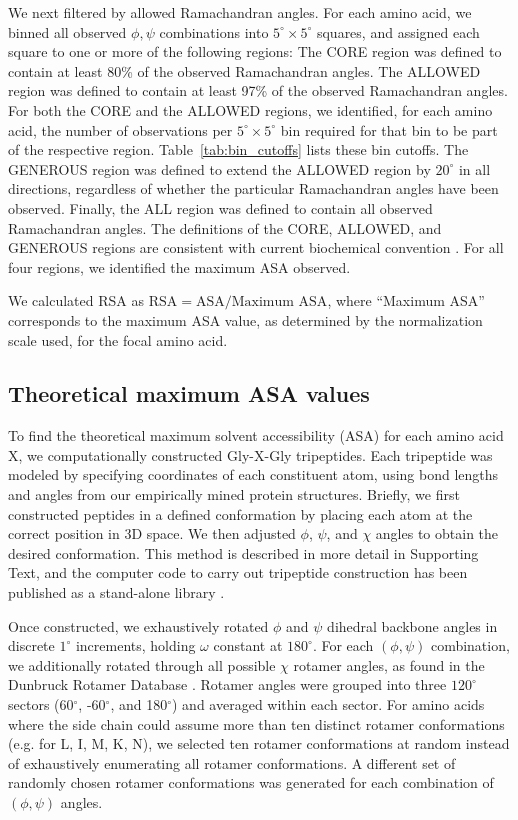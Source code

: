 \documentclass[11pt]{article}
\begin{document}
We next filtered by allowed Ramachandran angles. For each amino acid, we binned all observed $\phi, \psi$ combinations into $5^\circ\times5^\circ$ squares, and assigned each square to one or more of the following regions: The CORE region was defined to contain at least 80\% of the observed Ramachandran angles. The ALLOWED region was defined to contain at least 97\% of the observed Ramachandran angles. For both the CORE and the ALLOWED regions, we identified, for each amino acid, the number of observations per $5^\circ\times5^\circ$ bin required for that bin to be part of the respective region. Table~\ref{tab:bin_cutoffs} lists these bin cutoffs. The GENEROUS region was defined to extend the ALLOWED region by $20^\circ$ in all directions, regardless of whether the particular Ramachandran angles have been observed. Finally, the ALL region was defined to contain all observed Ramachandran angles. The definitions of the CORE, ALLOWED, and GENEROUS regions are consistent with current biochemical convention \cite{Morrisetal1992,Laskowskietal1993}. For all four regions, we identified the maximum ASA observed.

We calculated RSA as $\text{RSA}=\text{ASA}/\text{Maximum ASA}$, where ``Maximum ASA'' corresponds to the maximum ASA value, as determined by the normalization scale used, for the focal amino acid. 



\subsection*{Theoretical maximum ASA values}

To find the theoretical maximum solvent accessibility (ASA) for each amino acid X, we computationally constructed Gly-X-Gly tripeptides. Each tripeptide was modeled by specifying coordinates of each constituent atom, using bond lengths and angles from our empirically mined protein structures. Briefly, we first constructed peptides in a defined conformation by placing each atom at the correct position in 3D space. We then adjusted $\phi$, $\psi$, and $\chi$ angles to obtain the desired conformation. This method is described in more detail in Supporting Text, and the computer code to carry out tripeptide construction has been published as a stand-alone library \cite{Tienetal2013}. 

Once constructed, we exhaustively rotated $\phi$ and $\psi$ dihedral backbone angles in discrete $1^\circ$ increments, holding $\omega$ constant at $180^\circ$. For each $(\phi, \psi)$ combination, we additionally rotated through all possible $\chi$ rotamer angles, as found in the Dunbruck Rotamer Database \cite{WangDunbrack2003}. Rotamer angles were grouped into three $120^\circ$ sectors (60$^\circ$, -60$^\circ$, and 180$^\circ$) and averaged within each sector. For amino acids where the side chain could assume more than ten distinct rotamer conformations (e.g. for L, I, M, K, N), we selected ten rotamer conformations at random instead of exhaustively enumerating all rotamer conformations. A different set of randomly chosen rotamer conformations was generated for each combination of $(\phi, \psi)$ angles. 
\end{document}
